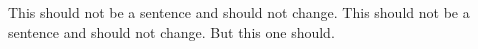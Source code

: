 This should not be a sentence  and should not change.
This should not be a sentence  and should not change.
But this one should.
